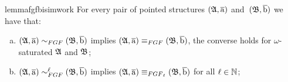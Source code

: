 \ifmainpart
\begin{restatable}{lemma}{fgfbisimwork}\label{lem:FGF-bisimulations-work-well}
For every pair of pointed structures $({\mathfrak{A}}, \overline{\mathrm{a}})$ and~$({\mathfrak{B}}, \overline{\mathrm{b}})$ we have that:
\begin{enumerate}[(a)]
\item $(\str{A}, \elemtuplea) \bisimto_{\FGF} (\str{B}, \elemtupleb)$ implies $(\str{A}, \elemtuplea) \equiv_{\FGF} (\str{B}, \elemtupleb)$, the converse holds for $\omega$-saturated ${\mathfrak{A}}$ and ${\mathfrak{B}}$;
\item $(\str{A}, \elemtuplea) \bisimto_{\FGF}^{\ell} (\str{B}, \elemtupleb)$ implies $(\str{A}, \elemtuplea) \equiv_{\FGF_\ell} (\str{B}, \elemtupleb)$ for all $\ell \in {\mathbb{N}}$;
\end{enumerate}
\end{restatable}
\else
